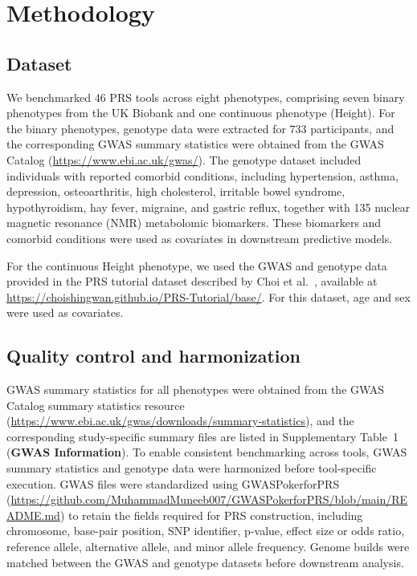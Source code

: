 \documentclass[pdflatex,sn-basic]{sn-jnl}
\begin{document}
\section*{Methodology}
\label{Methodology}

\subsection*{Dataset}
We benchmarked 46 PRS tools across eight phenotypes, comprising seven binary phenotypes from the UK Biobank and one continuous phenotype (Height). For the binary phenotypes, genotype data were extracted for 733 participants, and the corresponding GWAS summary statistics were obtained from the GWAS Catalog (\url{https://www.ebi.ac.uk/gwas/}). The genotype dataset included individuals with reported comorbid conditions, including hypertension, asthma, depression, osteoarthritis, high cholesterol, irritable bowel syndrome, hypothyroidism, hay fever, migraine, and gastric reflux, together with 135 nuclear magnetic resonance (NMR) metabolomic biomarkers. These biomarkers and comorbid conditions were used as covariates in downstream predictive models.

For the continuous Height phenotype, we used the GWAS and genotype data provided in the PRS tutorial dataset described by Choi et al.~\cite{Choi2020}, available at \url{https://choishingwan.github.io/PRS-Tutorial/base/}. For this dataset, age and sex were used as covariates.






  


 



\subsection*{Quality control and harmonization}
GWAS summary statistics for all phenotypes were obtained from the GWAS Catalog summary statistics resource (\url{https://www.ebi.ac.uk/gwas/downloads/summary-statistics}), and the corresponding study-specific summary files are listed in Supplementary Table~1 (\textbf{GWAS Information}). To enable consistent benchmarking across tools, GWAS summary statistics and genotype data were harmonized before tool-specific execution. GWAS files were standardized using GWASPokerforPRS (\url{https://github.com/MuhammadMuneeb007/GWASPokerforPRS/blob/main/README.md}) to retain the fields required for PRS construction, including chromosome, base-pair position, SNP identifier, p-value, effect size or odds ratio, reference allele, alternative allele, and minor allele frequency. Genome builds were matched between the GWAS and genotype datasets before downstream analysis. 
\end{document}
